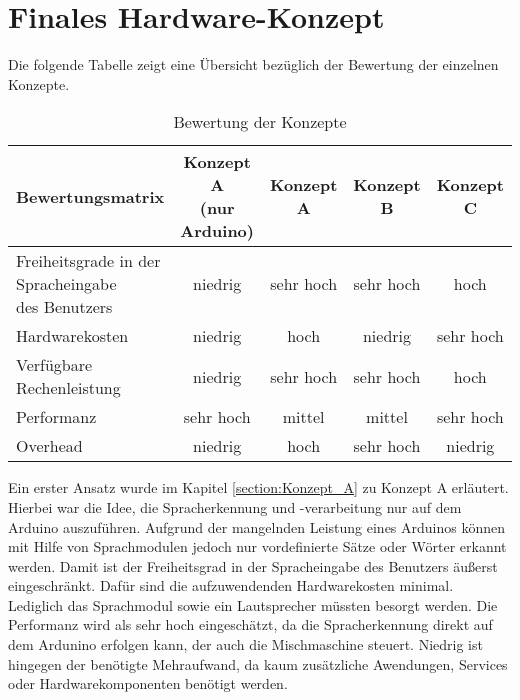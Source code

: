 \section{Finales Hardware-Konzept}
Die folgende Tabelle zeigt eine Übersicht bezüglich der Bewertung der einzelnen Konzepte.
\begin{table}[H]
    \centering
    \begin{tabular}{l|c|c|c|c}
        Bewertungsmatrix          & \makecell{Konzept A                                     \\ (nur Arduino)} & Konzept A & Konzept B & Konzept C \\
        \hline
        \makecell[l]{Freiheitsgrade in der Spracheingabe                                    \\ des Benutzers} & niedrig                    & sehr hoch & sehr hoch & hoch      \\
        \hline
        Hardwarekosten            & niedrig             & hoch      & niedrig   & sehr hoch \\
        \hline
        Verfügbare Rechenleistung & niedrig             & sehr hoch & sehr hoch & hoch      \\
        \hline
        Performanz                & sehr hoch           & mittel    & mittel    & sehr hoch \\
        \hline
        Overhead                  & niedrig             & hoch      & sehr hoch & niedrig   \\
    \end{tabular}
    \caption{\label{table:Bewertungsmatrix_Konzepte}Bewertung der Konzepte}
\end{table}
\noindent
Ein erster Ansatz wurde im Kapitel \ref{section:Konzept_A} zu Konzept A erläutert.
Hierbei war die Idee, die Spracherkennung und -verarbeitung nur auf dem Arduino auszuführen.
Aufgrund der mangelnden Leistung eines Arduinos können mit Hilfe von Sprachmodulen jedoch nur vordefinierte Sätze oder Wörter erkannt werden.
Damit ist der Freiheitsgrad in der Spracheingabe des Benutzers äußerst eingeschränkt.
Dafür sind die aufzuwendenden Hardwarekosten minimal.
Lediglich das Sprachmodul sowie ein Lautsprecher müssten besorgt werden.
Die Performanz wird als sehr hoch eingeschätzt, da die Spracherkennung direkt auf dem Ardunino erfolgen kann, der auch die Mischmaschine steuert.
Niedrig ist hingegen der benötigte Mehraufwand, da kaum zusätzliche Awendungen, Services oder Hardwarekomponenten benötigt werden.\\\\
